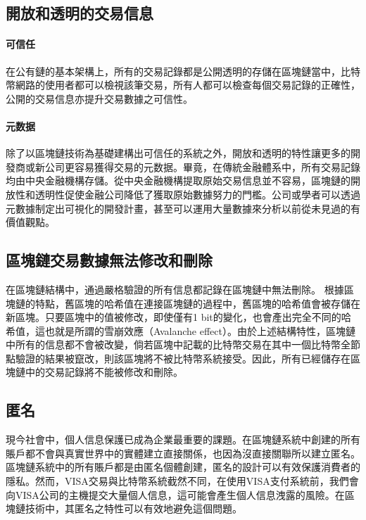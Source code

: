 		\subsection{開放和透明的交易信息}

			\paragraph{可信任}在公有鏈的基本架構上，所有的交易記錄都是公開透明的存儲在區塊鏈當中，比特幣網路的使用者都可以檢視該筆交易，所有人都可以檢查每個交易記錄的正確性，公開的交易信息亦提升交易數據之可信性。
			\paragraph{元数据}除了以區塊鏈技術為基礎建構出可信任的系統之外，開放和透明的特性讓更多的開發商或新公司更容易獲得交易的元数据。畢竟，在傳統金融體系中，所有交易記錄均由中央金融機構存儲。從中央金融機構提取原始交易信息並不容易，區塊鏈的開放性和透明性促使金融公司降低了獲取原始數據努力的門檻。公司或學者可以透過元數據制定出可視化的開發計畫，甚至可以運用大量數據來分析以前從未見過的有價值觀點。

		\subsection{區塊鏈交易數據無法修改和刪除}在區塊鏈結構中，通過嚴格驗證的所有信息都記錄在區塊鏈中無法刪除。 根據區塊鏈的特點，舊區塊的哈希值在連接區塊鏈的過程中，舊區塊的哈希值會被存儲在新區塊。只要區塊中的值被修改，即使僅有1 bit的變化，也會產出完全不同的哈希值，這也就是所謂的雪崩效應（Avalanche effect）\supercite{Theuseofbentsequencestoachievehigher-orderstrictavalanchecriterioninS-boxdesign}。由於上述結構特性，區塊鏈中所有的信息都不會被改變，倘若區塊中記載的比特幣交易在其中一個比特幣全節點驗證的結果被竄改，則該區塊將不被比特幣系統接受。因此，所有已經儲存在區塊鏈中的交易記錄將不能被修改和刪除。

		\subsection{匿名}現今社會中，個人信息保護已成為企業最重要的課題。在區塊鏈系統中創建的所有賬戶都不會與真實世界中的實體建立直接關係，也因為沒直接關聯所以建立匿名。區塊鏈系統中的所有賬戶都是由匿名個體創建，匿名的設計可以有效保護消費者的隱私。然而，VISA交易與比特幣系統截然不同，在使用VISA支付系統前，我們會向VISA公司的主機提交大量個人信息，這可能會產生個人信息洩露的風險。在區塊鏈技術中，其匿名之特性可以有效地避免這個問題。


